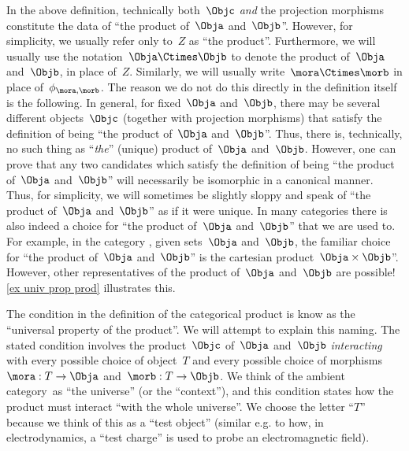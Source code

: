 \begin{remark}
  \label{prod unique up to iso}
  In the above definition, technically both~$\Objc$ \emph{and} the projection morphisms constitute the data of ``the product of~$\Obja$ and~$\Objb$''. However, for simplicity, we usually refer only to~$Z$ as ``the product''. Furthermore, we will usually use the notation~$\Obja \Ctimes \Objb$ to denote the product of~$\Obja$ and~$\Objb$, in place of~$Z$. Similarly, we will usually write~$\mora \Ctimes \morb$ in place of~$\phi_{\mora, \morb}$. The reason we do not do this directly in the definition itself is the following. In general, for fixed~$\Obja$ and~$\Objb$, there may be several different objects~$\Objc$ (together with projection morphisms) that satisfy the definition of being ``the product of~$\Obja$ and~$\Objb$''. Thus, there is, technically, no such thing as ``\emph{the}'' (unique) product of~$\Obja$ and~$\Objb$. However, one can prove that any two candidates which satisfy the definition of being ``the product of~$\Obja$ and~$\Objb$'' will necessarily be isomorphic in a canonical manner. Thus, for simplicity, we will sometimes be slightly sloppy and speak of ``the product of~$\Obja$ and~$\Objb$'' as if it were unique. In many categories there is also indeed a choice for ``the product of~$\Obja$ and~$\Objb$'' that we are used to. For example, in the category \Set, given sets~$\Obja$ and~$\Objb$, the familiar choice for ``the product of~$\Obja$ and~$\Objb$'' is the cartesian product~$\Obja \times \Objb$''. However, other representatives of the product of~$\Obja$ and~$\Objb$ are possible! \cref{ex univ prop prod} illustrates this.
\end{remark}

\begin{remark}
  The condition in the definition of the categorical product is know as the ``universal property of the product''. We will attempt to explain this naming. The stated condition involves the product~$\Objc$ of~$\Obja$ and~$\Objb$ \emph{interacting} with every possible choice of object~$T$ and every possible choice of morphisms~$\mora : T \to \Obja$ and~$\morb: T \to \Objb$. We think of the ambient category~\CatC as ``the universe'' (or the ``context''), and this condition states how the product must interact ``with the whole universe''.
  We choose the letter ``$T$'' because we think of this as a ``test object'' (similar e.g. to how, in electrodynamics, a ``test charge'' is used to probe an electromagnetic field).
\end{remark}


